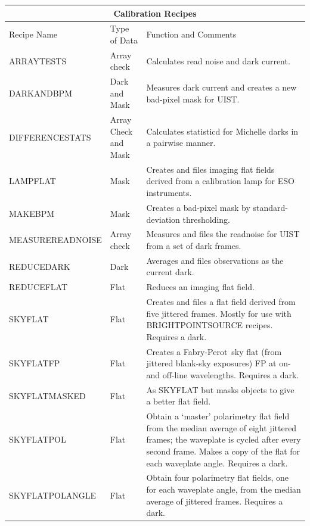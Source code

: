 \documentclass[twoside,11pt]{article}
\newcommand{\htmladdnormallink}[2]{#1}
\newcommand{\htmlref}[2]{#1}
\renewcommand{\_}{\texttt{\symbol{95}}}
\newcommand{\FP}{\htmladdnormallink{Fabry-Perot}{http://www.jach.hawaii.edu/JACpublic/UKIRT/instruments/ufti/ufti_fp.html}}
\begin{document}
\begin{center}
\begin{tabular}{|l|p{26mm}|p{75mm}|}
\multicolumn{3}{c}{\large{\bf Calibration Recipes}} \vspace*{1ex} \\
\hline
Recipe Name & Type of Data & Function and Comments \\ \hline
\htmlref{ARRAY\_TESTS}{ARRAY\_TESTS} & Array check &
   Calculates read noise and dark current. \\ \hline
\htmlref{DARK\_AND\_BPM}{DARK\_AND\_BPM} & Dark and Mask &
   Measures dark current and creates a new bad-pixel mask for UIST. \\ \hline
\htmlref{DIFFERENCE\_STATS}{DIFFERENCE\_STATS} & Array Check and Mask &
   Calculates statisticd for Michelle darks in a pairwise manner. \\\hline
\htmlref{LAMP\_FLAT}{LAMP\_FLAT} & Mask  &
   Creates and files imaging flat fields derived from a calibration
   lamp for ESO instruments. \\ \hline
\htmlref{MAKE\_BPM}{MAKE\_BPM} & Mask  &
   Creates a bad-pixel mask by standard-deviation thresholding. \\ \hline
\htmlref{MEASURE\_READNOISE}{MEASURE\_READNOISE} & Array check &
   Measures and files the readnoise for UIST from a set of dark frames.\\ \hline
\htmlref{REDUCE\_DARK}{REDUCE\_DARK} & Dark &
   Averages and files observations as the current dark. \\ \hline
\htmlref{REDUCE\_FLAT}{REDUCE\_FLAT} & Flat &
   Reduces an imaging flat field.\\ \hline
\htmlref{SKY\_FLAT}{SKY\_FLAT} & Flat &
   Creates and files a flat field derived from five jittered frames.
   Mostly for use with BRIGHT\_POINT\_SOURCE recipes. Requires a
   dark.\\ \hline
\htmlref{SKY\_FLAT\_FP}{SKY\_FLAT\_FP} & Flat &
   Creates a \FP\ sky flat (from jittered blank-sky exposures) 
   FP at on- and off-line wavelengths.  Requires a dark. \\ \hline
\htmlref{SKY\_FLAT\_MASKED}{SKY\_FLAT\_MASKED} & Flat &
   As SKY\_FLAT but masks objects to give a better flat field. \\ \hline
\htmlref{SKY\_FLAT\_POL}{SKY\_FLAT\_POL} & Flat &
   Obtain a `master' polarimetry flat field from the median average
   of eight jittered frames; the waveplate is cycled after
   every second frame.  Makes a copy of the flat for each
   waveplate angle. Requires a dark.\\ \hline
\htmlref{SKY\_FLAT\_POL\_ANGLE}{SKY\_FLAT\_POL\_ANGLE} & Flat &
   Obtain four polarimetry flat fields, one for each waveplate angle,
   from the median average of jittered frames. Requires a dark.\\ \hline
\end{tabular}
\end{center}
\end{document}
